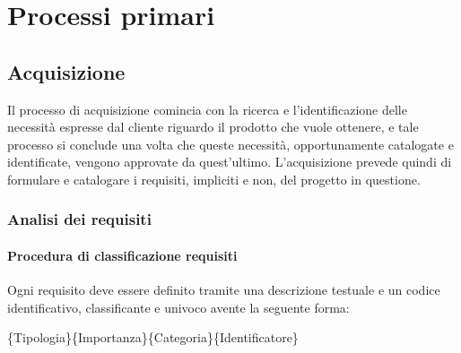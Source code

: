 \section{Processi primari}

\subsection{Acquisizione}
Il processo di acquisizione comincia con la ricerca e l'identificazione delle necessità espresse dal cliente riguardo il prodotto che vuole ottenere, e tale processo si conclude una volta che queste necessità, opportunamente catalogate e identificate, vengono approvate da quest'ultimo.
L'acquisizione prevede quindi di formulare e catalogare i requisiti, impliciti e non, del progetto in questione.

\subsubsection{Analisi dei requisiti}
\paragraph{Procedura di classificazione requisiti}
Ogni requisito deve essere definito tramite  una descrizione testuale e un codice identificativo, classificante e univoco avente la seguente forma:

\begin{center}\{Tipologia\}\{Importanza\}\{Categoria\}\{Identificatore\}\end{center}


